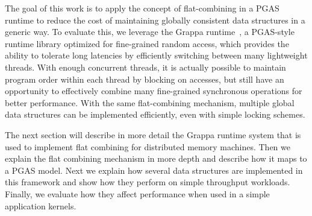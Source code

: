 The goal of this work is to apply the concept of flat-combining in a PGAS runtime to reduce the cost of maintaining globally consistent data structures in a generic way.
To evaluate this, we leverage the Grappa runtime~\cite{Nelson:hotpar11-real}, a PGAS-style runtime library optimized for fine-grained random access, which provides the ability to tolerate long latencies by efficiently switching between many lightweight threads.
With enough concurrent threads, it is actually possible to maintain program order within each thread by blocking on accesses, but still have an opportunity to effectively combine many fine-grained synchronous operations for better performance.
With the same flat-combining mechanism, multiple global data structures can be implemented efficiently, even with simple locking schemes.

The next section will describe in more detail the Grappa runtime system that is used to implement flat combining for distributed memory machines. Then we explain the flat combining mechanism in more depth and describe how it maps to a PGAS model. Next we explain how several data structures are implemented in this framework and show how they perform on simple throughput workloads. Finally, we evaluate how they affect performance when used in a simple application kernels.

